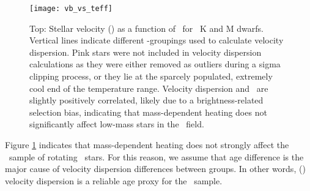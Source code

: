\begin{figure}
  \caption{
      Top: Stellar velocity (\vb) as a function of \teff\ for
      \kepler\ K and M dwarfs.
Vertical lines indicate different \teff-groupings used to calculate velocity
    dispersion.
Pink stars were not included in velocity dispersion calculations as they were
    either removed as outliers during a sigma clipping process, or they lie at
    the sparcely populated, extremely cool end of the temperature range.
    Velocity dispersion and \teff\ are slightly positively correlated, likely
    due to a brightness-related selection bias, indicating that mass-dependent
    heating does not significantly affect low-mass stars in the \kepler\
    field.
}
  \centering
    \texttt{[image: vb\_vs\_teff]}
\label{fig:vb_vs_teff}
\end{figure}
Figure \ref{fig:vb_vs_teff} indicates that mass-dependent heating does not
strongly affect the \mct\ sample of rotating \kepler\ stars.
For this reason, we assume that age difference is the major cause of velocity
dispersion differences between groups.
In other words, (\vb) velocity dispersion is a reliable age proxy for the
\mct\ sample.



